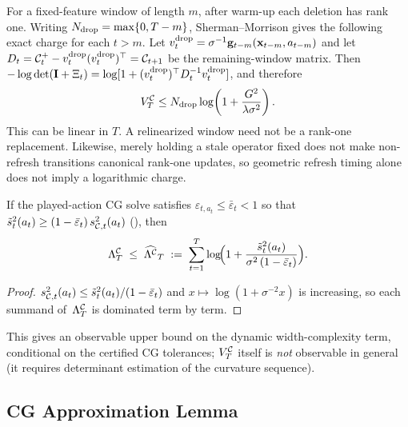 For a fixed-feature window of length $m$, after warm-up each deletion has
rank one.  Writing $N_{\rm drop}=\max\{0,T-m\}$, Sherman--Morrison gives the
following exact charge for each $t>m$.  Let
$v_t^{\rm drop}=\sigma^{-1}\mathbf{g}_{t-m}(\mathbf{x}_{t-m},a_{t-m})$ and let
$D_t=\mathcal{C}_t^+-v_t^{\rm drop}(v_t^{\rm drop})^\top=\mathcal{C}_{t+1}$ be the
remaining-window matrix.  Then
$-\log\det(\mathbf{I}+\Xi_t)=
\log[1+(v_t^{\rm drop})^\top D_t^{-1}v_t^{\rm drop}]$, and therefore
\[
 V^{\mathcal{C}}_T\le N_{\rm drop}\log\!\left(1+\frac{G^2}{\lambda\sigma^2}\right).
\]
This can be linear in $T$.  A relinearized window need not be a rank-one
replacement.  Likewise, merely holding a stale operator fixed does not make
non-refresh transitions canonical rank-one updates, so geometric refresh timing
alone does not imply a logarithmic charge.

\begin{corollary}\label{cor:lam-observable}
If the played-action CG solve satisfies $\varepsilon_{t,a_t}\le\bar\varepsilon_t<1$
so that $\tilde s_t^2(a_t)\ge(1-\bar\varepsilon_t)\,s_{\mathcal{C},t}^2(a_t)$
(), then
\begin{equation}\label{eq:lam-observable}
  \Lambda^{\mathcal{C}}_T
  \;\le\;
  \widehat{\Lambda^{\mathcal{C}}}_T
  \;:=\;
  \sum_{t=1}^T
  \log\!\Bigl(1+\frac{\tilde s_t^2(a_t)}{\sigma^2\,(1-\bar\varepsilon_t)}\Bigr).
\end{equation}
\end{corollary}
\begin{proof}
$s_{\mathcal{C},t}^2(a_t)\le\tilde s_t^2(a_t)/(1-\bar\varepsilon_t)$ and
$x\mapsto\log(1+\sigma^{-2}x)$ is increasing, so each summand
of~$\Lambda^{\mathcal{C}}_T$ is dominated term by term.
\end{proof}

\noindent
This gives an observable upper bound on the dynamic width-complexity term,
conditional on the certified CG tolerances; $V^{\mathcal{C}}_T$ itself is \emph{not}
observable in general (it requires determinant estimation of the curvature
sequence).



\subsection{CG Approximation Lemma}

